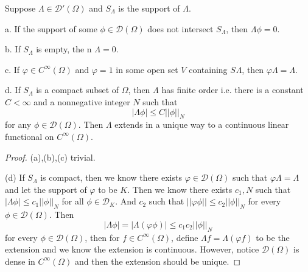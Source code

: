 \documentclass[lang=en, color=blue, ]{elegantbook}
\newcommand{\D}{\mathscr{D}}
\begin{document}
\begin{theorem}
    Suppose $\Lambda \in \D'(\Omega)$ and $S_{\Lambda}$ is the support of $\Lambda$.\par
    a. If the support of some $\phi \in \D(\Omega)$ does not intersect $S_{\Lambda}$, then $\Lambda \phi = 0$.\par
    b. If $S_{\Lambda}$ is empty, the n $\Lambda = 0$.\par
    c. If $\varphi \in C^{\infty}(\Omega)$ and $\varphi = 1$ in some open set $V$ containing $S_{}\Lambda$, then $\varphi \Lambda = \Lambda$.\par
    d. If $S_{\Lambda}$ is a compact subset of $\Omega$, then $\Lambda$ has finite order i.e. there is a constant $C < \infty$ and a nonnegative integer $N$ such that
    \[
    |\Lambda \phi| \leq C||\phi||_N
    \]
    for any $\phi \in \D(\Omega)$. Then $\Lambda$ extends in a unique way to a continuous linear functional on $C^{\infty}(\Omega)$.
\end{theorem}
\begin{proof}
    (a),(b),(c) trivial.\par
    (d) If $S_{\Lambda}$ is compact, then we know there exists $\varphi \in \D(\Omega)$ such that $\varphi\Lambda = \Lambda$ and let the support of $\varphi$ to be $K$. Then we know there exists $c_1,N$ such that $|\Lambda \phi| \leq c_1||\phi||_N$ for all $\phi \in \D_K$. And $c_2$ such that $||\varphi\phi|| \leq c_2||\phi||_N$ for every $\phi \in \D(\Omega)$. Then
    \[
    |\Lambda \phi| = |\Lambda(\varphi\phi)| \leq c_1c_2||\phi||_N
    \]
    for every $\phi \in \D(\Omega)$, then for $f\in C^{\infty}(\Omega)$, define $\Lambda f = \Lambda(\varphi f)$ to be the extension and we know the extension is continuous. However, notice $\D(\Omega)$ is dense in $C^{\infty}(\Omega)$ and then the extension should be unique.
\end{proof}
\end{document}
